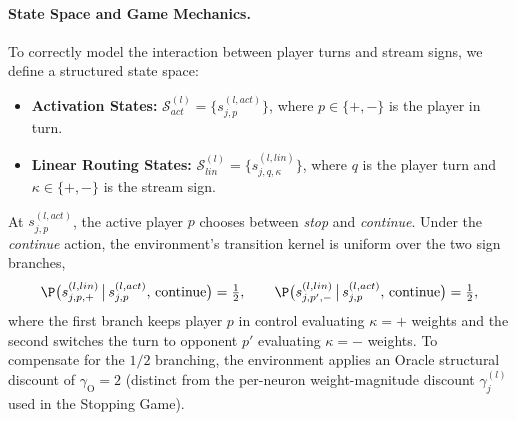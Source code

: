 \paragraph{State Space and Game Mechanics.}
To correctly model the interaction between player turns and stream signs, we define a structured
state space:
\begin{itemize}
    \item \textbf{Activation States:} $\mathcal{S}_{act}^{(l)} = \{ s_{j,p}^{(l, act)} \}$, where $p \in
            \{+,-\}$ is the player in turn.
    \item \textbf{Linear Routing States:} $\mathcal{S}_{lin}^{(l)} = \{ s_{j,q,\kappa}^{(l, lin)} \}$, where
        $q$ is the player turn and $\kappa \in \{+,-\}$ is the stream sign.
\end{itemize}
At $s_{j,p}^{(l, act)}$, the active player $p$ chooses between \emph{stop} and \emph{continue}.
Under the \emph{continue} action, the environment's transition kernel is uniform over the two sign
branches,
\begin{align}
    \P\bigl(s_{j,p,+}^{(l, lin)} \,\big|\, s_{j,p}^{(l, act)},\, \mathrm{continue}\bigr) =
    \tfrac{1}{2},
    \qquad
    \P\bigl(s_{j,p',-}^{(l, lin)} \,\big|\, s_{j,p}^{(l, act)},\, \mathrm{continue}\bigr) =
    \tfrac{1}{2},
\end{align}
where the first branch keeps player $p$ in control evaluating $\kappa=+$ weights and the second
switches the turn to opponent $p'$ evaluating $\kappa=-$ weights. To compensate for the $1/2$
branching, the environment applies an Oracle structural discount of $\gamma_{\mathrm{O}} = 2$
(distinct from the per-neuron weight-magnitude discount $\gamma_j^{(l)}$ used in the Stopping
Game).

